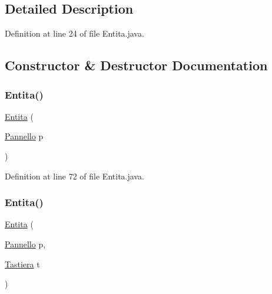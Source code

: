 \subsection{Detailed Description}


Definition at line 24 of file Entita.\+java.



\subsection{Constructor \& Destructor Documentation}
\mbox{\label{class_entita_1_1_entita_a2080d433e5b9b6ce5c9f0b9ec426e6fb}} 
\subsubsection{\texorpdfstring{Entita()}{Entita()}\hspace{0.1cm}{\footnotesize\ttfamily [1/2]}}
{\footnotesize\ttfamily \hyperlink{class_entita_1_1_entita}{Entita} (\begin{DoxyParamCaption}\item[{\hyperlink{classa_1_1survival_1_1game_1_1_pannello}{Pannello}}]{p }\end{DoxyParamCaption})}



Definition at line 72 of file Entita.\+java.

\mbox{\label{class_entita_1_1_entita_a6984a7f67889d66d0b6e3627ff46b289}} 
\subsubsection{\texorpdfstring{Entita()}{Entita()}\hspace{0.1cm}{\footnotesize\ttfamily [2/2]}}
{\footnotesize\ttfamily \hyperlink{class_entita_1_1_entita}{Entita} (\begin{DoxyParamCaption}\item[{\hyperlink{classa_1_1survival_1_1game_1_1_pannello}{Pannello}}]{p,  }\item[{\hyperlink{classa_1_1survival_1_1game_1_1_tastiera}{Tastiera}}]{t }\end{DoxyParamCaption})}



